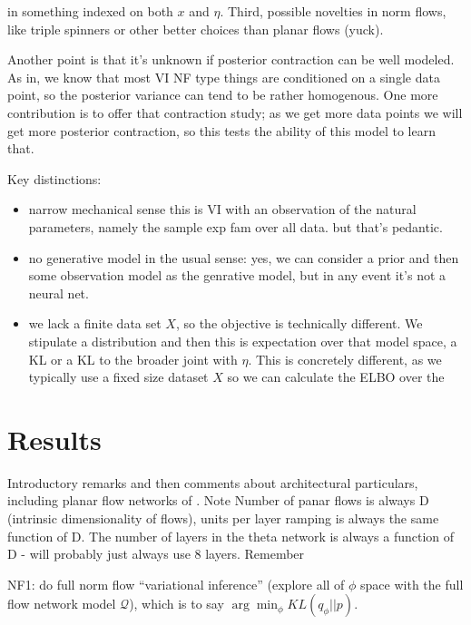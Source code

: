 \documentclass{article}
\begin{document}
in something indexed on both $x$ and $\eta$.  Third, possible novelties in norm flows, like triple spinners or other better choices than planar flows (yuck).

  Another point is that it's unknown if posterior contraction can be well modeled.  As in, we know that most VI NF type things are conditioned on a single data point, so the posterior variance can tend to be rather homogenous.  One more contribution is to offer that contraction study; as we get more data points we will get more posterior contraction, so this tests the ability of this model to learn that.
  
  Key distinctions:
  \begin{itemize}
  \item narrow mechanical sense this is VI with an observation of the natural parameters, namely the sample exp fam over all data.  but that's pedantic.
  \item no generative model in the usual sense: yes, we can consider a prior and then some observation model as the genrative model, but in any event it's not a neural net.
  \item we lack a finite data set $X$, so the objective is technically different.  We stipulate a distribution and then this is expectation over that model space, a KL or a KL to the broader joint with $\eta$.  This is concretely different, as we typically use a fixed size dataset $X$ so we can calculate the ELBO over the 
  \end{itemize}
  

 
 


  
\section{Results}

Introductory remarks and then comments about architectural particulars, including planar flow networks of \cite{rezende2015variational}. Note Number of panar flows is always D (intrinsic dimensionality of flows), units per layer ramping is always the same function of D.  The number of layers in the theta network is always a function of D - will probably just always use 8 layers.
Remember 

NF1: do full norm flow ``variational inference'' (explore all of $\phi$ space with the full flow network model $\mathcal{Q}$), which is to say $\arg\min_\phi KL(q_\phi || p)$.  
\end{document}
